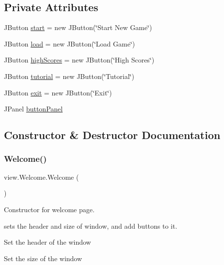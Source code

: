 \subsection*{Private Attributes}
\begin{DoxyCompactItemize}
\item 
J\+Button \hyperlink{classview_1_1_welcome_a3dfa36fd5db2280f2a2638bacf2d4155}{start} = new J\+Button(\char`\"{}Start New Game\char`\"{})
\item 
J\+Button \hyperlink{classview_1_1_welcome_a91a24fdd828b87e1307d4af30693401e}{load} = new J\+Button(\char`\"{}Load Game\char`\"{})
\item 
J\+Button \hyperlink{classview_1_1_welcome_a824f339b982b2e96f4c6b86287154c5a}{high\+Scores} = new J\+Button(\char`\"{}High Scores\char`\"{})
\item 
J\+Button \hyperlink{classview_1_1_welcome_a8fae2e33d73c97d4bbcc331f050bd68c}{tutorial} = new J\+Button(\char`\"{}Tutorial\char`\"{})
\item 
J\+Button \hyperlink{classview_1_1_welcome_a5a1ae16f7fb3b7f271353133e58bda15}{exit} = new J\+Button(\char`\"{}Exit\char`\"{})
\item 
J\+Panel \hyperlink{classview_1_1_welcome_a846eb5f76566811de2fb852412fb56dc}{button\+Panel}
\end{DoxyCompactItemize}


\subsection{Constructor \& Destructor Documentation}
\hypertarget{classview_1_1_welcome_ac0d0158b691ccb4dbca2c78145e4a522}{}\label{classview_1_1_welcome_ac0d0158b691ccb4dbca2c78145e4a522} 
\subsubsection{\texorpdfstring{Welcome()}{Welcome()}}
{\footnotesize\ttfamily view.\+Welcome.\+Welcome (\begin{DoxyParamCaption}{ }\end{DoxyParamCaption})}



Constructor for welcome page. 

sets the header and size of window, and add buttons to it. 
\begin{DoxyItemize}
\item Set the header of the window
\item Set the size of the window
\end{DoxyItemize}

